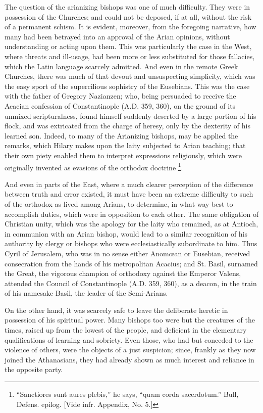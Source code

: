 The question of the arianizing bishops was one of much difficulty.
They were in possession of the Churches; and could not be deposed, if
at all, without the risk of a permanent schism. It is evident,
moreover, from the foregoing narrative, how many had been betrayed
into an approval of the Arian opinions, without understanding or
acting upon them. This was particularly the case in the West, where
threats and ill-usage, had been more or less substituted for those
fallacies, which the Latin language scarcely admitted. And even in the
remote Greek Churches, there was much of that devout and unsuspecting
simplicity, which was the easy sport of the supercilious sophistry of
the Eusebians. This was the case with the father of Gregory Nazianzen;
who, being persuaded to receive the Acacian confession of
Constantinople (A.D. 359, 360), on the ground of
its unmixed scripturalness, found himself suddenly deserted by a large
portion of his flock, and was extricated from the charge of
heresy, only by the dexterity of his learned son. Indeed, to many of
the Arianizing bishops, may be applied the remarks, which Hilary makes
upon the laity subjected to Arian teaching; that their own piety
enabled them to interpret expressions religiously, which were
originally invented as evasions of the orthodox doctrine \footnote{``Sanctiores sunt aures plebis,'' he
says, ``quam corda sacerdotum.'' Bull, Defens. epilog. [Vide
infr. Appendix, No. 5.]}.

And even in parts of the East, where a much clearer perception of
the difference between truth and error existed, it must have been an
extreme difficulty to such of the orthodox as lived among Arians, to
determine, in what way best to accomplish duties, which were in
opposition to each other. The same obligation of Christian unity,
which was the apology for the laity who remained, as at Antioch, in
communion with an Arian bishop, would lead to a similar recognition of
his authority by clergy or bishops who were ecclesiastically
subordinate to him. Thus Cyril of Jerusalem, who was in no sense
either Anomœan or Eusebian, received consecration from the hands of
his metropolitan Acacius; and St. Basil, surnamed the Great, the
vigorous champion of orthodoxy against the Emperor Valens, attended
the Council of Constantinople (A.D. 359, 360),
as a deacon, in the train of his namesake Basil, the leader of the
Semi-Arians.

On the other hand, it was scarcely safe to leave the deliberate
heretic in possession of his spiritual power. Many bishops too were
but the creatures of the times, raised up from the lowest of the
people, and deficient in the elementary qualifications of learning and
sobriety. Even those, who had but conceded to the violence of
others, were the objects of a just suspicion; since, frankly as they
now joined the Athanasians, they had already shown as much interest
and reliance in the opposite party.

